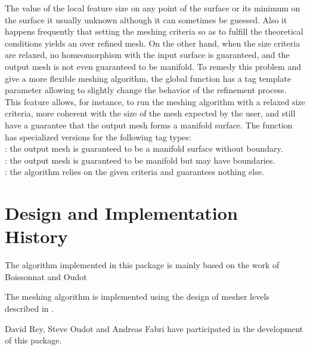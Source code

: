 The value of the local feature size on any point of the surface
or its minimum on the surface it usually unknown
although it can sometimes be guessed. Also it happens frequently
that setting the meshing criteria so as to fulfill the theoretical
conditions yields an over refined mesh.
On the other hand, when the size criteria are relaxed,
no homeomorphism with the input surface is guaranteed,
and the output mesh is not even guaranteed to be manifold.
To remedy this problem and give a more flexible
meshing algorithm, the global function 
 has a tag template parameter
allowing to slightly change the behavior of the refinement process.
This feature allows, for instance,  to run the meshing
algorithm with a relaxed size criteria, more coherent
with the size of the mesh expected by the user,
and still have a guarantee that
the output mesh forms a manifold surface.
The function  has specialized versions
for the following  tag types: \\
: the output mesh is guaranteed to be a manifold
surface without boundary.\\
: the output mesh is guaranteed to be
manifold but may have boundaries.\\
: the algorithm relies on the given criteria and
guarantees nothing else.




\section{Design and Implementation History}

The algorithm implemented in this package
is mainly based on the  work of Boissonnat and Oudot
\cite{cgal:bo-pgsms-05}

The meshing algorithm is implemented using the design of mesher levels
described in \cite{cgal:ry-gsddrm-06}. 

David Rey, Steve Oudot and Andreas Fabri have participated
in the development of this package.




